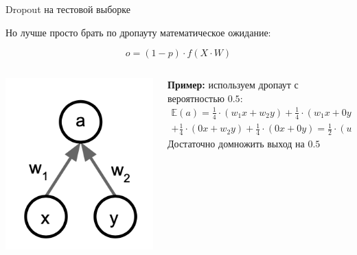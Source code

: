 \documentclass[notes,12pt, aspectratio=169]{beamer}
\newenvironment{wideitemize}{\itemize\addtolength{\itemsep}{10pt}}{\enditemize}
\begin{document}
\begin{frame}{Dropout на тестовой выборке}
	\begin{wideitemize}
		\item Но лучше просто брать по дропауту математическое ожидание: 
		
		$$
		o =(1 - p) \cdot f(X \cdot W)
		$$
	\end{wideitemize}
	\begin{columns}
		\begin{column}{.25\textwidth}
			\begin{center}
				\includegraphics[width=.85\linewidth]{dropout_ex.png}
			\end{center}
		\end{column}
		\begin{column}{.75\textwidth}
			\textbf{Пример:} используем дропаут с вероятностью $0.5$: \\
			\begin{multline*}
				\mathbb{E}(a) = \frac{1}{4} \cdot(w_1 x+ w_2 y) + \frac{1}{4} \cdot(w_1 x+ 0 y) + \\ + \frac{1}{4} \cdot(0 x+ w_2 y) + \frac{1}{4} \cdot(0 x+ 0 y) = \frac{1}{2} \cdot (w_1 \cdot x + w_2 \cdot y)
			\end{multline*}
			\alert{Достаточно домножить выход на $0.5$}
		\end{column}
	\end{columns}
\end{frame}
\end{document}
